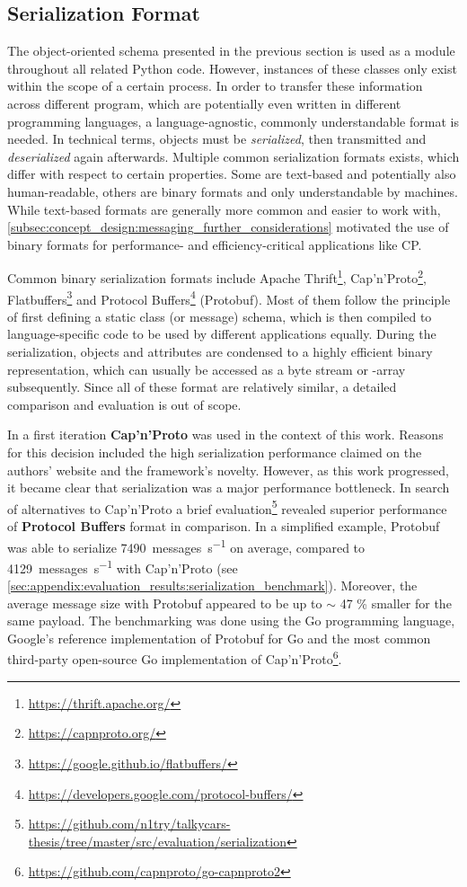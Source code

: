\subsection{Serialization Format}
\label{subsec:implementation:serialization_format}
The object-oriented schema presented in the previous section is used as a module throughout all related Python code. However, instances of these classes only exist within the scope of a certain process. In order to transfer these information across different program, which are potentially even written in different programming languages, a language-agnostic, commonly understandable format is needed. In technical terms, objects must be \textit{serialized}, then transmitted and \textit{deserialized} again afterwards. Multiple common serialization formats exists, which differ with respect to certain properties. Some are text-based and potentially also human-readable, others are binary formats and only understandable by machines. While text-based formats are generally more common and easier to work with, \cref{subsec:concept_design:messaging_further_considerations} motivated the use of binary formats for performance- and efficiency-critical applications like CP.

Common binary serialization formats include Apache Thrift\footnote{\url{https://thrift.apache.org/}}, Cap'n'Proto\footnote{\url{https://capnproto.org/}},  Flatbuffers\footnote{\url{https://google.github.io/flatbuffers/}} and Protocol Buffers\footnote{\url{https://developers.google.com/protocol-buffers/}} (Protobuf). Most of them follow the principle of first defining a static class (or message) schema, which is then compiled to language-specific code to be used by different applications equally. During the serialization, objects and attributes are condensed to a highly efficient binary representation, which can usually be accessed as a byte stream or -array subsequently. Since all of these format are relatively similar, a detailed comparison and evaluation is out of scope.

In a first iteration \textbf{Cap'n'Proto} was used in the context of this work. Reasons for this decision included the high serialization performance claimed on the authors' website and the framework's novelty. However, as this work progressed, it became clear that serialization was a major performance bottleneck. In search of alternatives to Cap'n'Proto a brief evaluation\footnote{\url{https://github.com/n1try/talkycars-thesis/tree/master/src/evaluation/serialization}} revealed superior performance of \textbf{Protocol Buffers} format in comparison. In a simplified example, Protobuf was able to serialize \SI{7490}{messages\per\second} on average, compared to \SI{4129}{messages\per\second} with Cap'n'Proto (see \cref{sec:appendix:evaluation_results:serialization_benchmark}). Moreover, the average message size with Protobuf appeared to be up to $\sim$ 47 \% smaller for the same payload. The benchmarking was done using the Go programming language, Google's reference implementation of Protobuf for Go and the most common third-party open-source Go implementation of Cap'n'Proto\footnote{\url{https://github.com/capnproto/go-capnproto2}}. 

